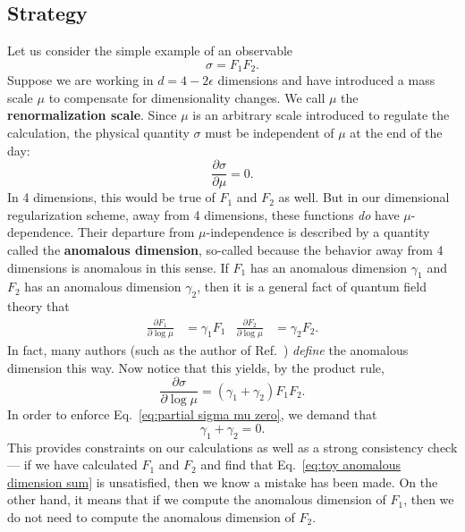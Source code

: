 \documentclass[12pt,twoside,class=../reedthesis, crop=false]{standalone}
\begin{document}
\subsection{Strategy}
	Let us consider the simple example of an observable
	\begin{equation}
		\sigma = F_1 F_2.
	\end{equation}
	Suppose we are working in $d = 4 - 2\epsilon$ dimensions and have introduced a mass scale $\mu$ to compensate for dimensionality changes. We call $\mu$ the \textbf{renormalization scale}. Since $\mu$ is an arbitrary scale introduced to regulate the calculation, the physical quantity $\sigma$ must be independent of $\mu$ at the end of the day:
	\begin{equation}\label{eq:partial sigma mu zero}
		\frac{\partial \sigma}{\partial \mu} = 0.
	\end{equation}
	In 4 dimensions, this would be true of $F_1$ and $F_2$ as well. But in our dimensional regularization scheme, away from 4 dimensions, these functions \textit{do} have $\mu$-dependence. Their departure from $\mu$-independence is described by a quantity called the \textbf{anomalous dimension}, so-called because the behavior away from 4 dimensions is anomalous in this sense. If $F_1$ has an anomalous dimension $\gamma_1$ and $F_2$ has an anomalous dimension $\gamma_2$, then it is a general fact of quantum field theory that \cite{schwartz_quantum_2014}
	\begin{align}\label{eq:toy RGE}
		\frac{\partial F_1}{\partial \log \mu} &= \gamma_1 F_1 & \frac{\partial F_2}{\partial \log \mu} &= \gamma_2 F_2.
	\end{align}
	In fact, many authors (such as the author of Ref.~\cite{schwartz_quantum_2014}) \textit{define} the anomalous dimension this way. Now notice that this yields, by the product rule,
	\begin{equation}
		\frac{\partial \sigma}{\partial \log \mu} = (\gamma_1 + \gamma_2) F_1 F_2.
	\end{equation}
	In order to enforce Eq.~\ref{eq:partial sigma mu zero}, we demand that
	\begin{equation}\label{eq:toy anomalous dimension sum}
		\gamma_1 + \gamma_2 = 0.
	\end{equation}
	This provides constraints on our calculations as well as a strong consistency check --- if we have calculated $F_1$ and $F_2$ and find that Eq.~\ref{eq:toy anomalous dimension sum} is unsatisfied, then we know a mistake has been made. On the other hand, it means that if we compute the anomalous dimension of $F_1$, then we do not need to compute the anomalous dimension of $F_2$.
\end{document}
